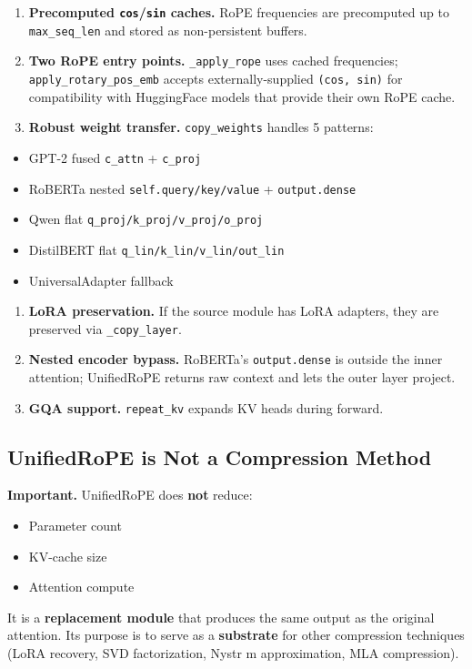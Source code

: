\begin{enumerate}
\item \textbf{Precomputed \texttt{cos}/\texttt{sin} caches.} RoPE frequencies are precomputed up
  to \texttt{max\_seq\_len} and stored as non-persistent buffers.

\item \textbf{Two RoPE entry points.} \texttt{\_apply\_rope} uses cached frequencies;
  \texttt{apply\_rotary\_pos\_emb} accepts externally-supplied \texttt{(cos, sin)} for
  compatibility with HuggingFace models that provide their own RoPE cache.

\item \textbf{Robust weight transfer.} \texttt{copy\_weights} handles 5 patterns:
\end{enumerate}
\begin{itemize}
\item GPT-2 fused \texttt{c\_attn} + \texttt{c\_proj}
\item RoBERTa nested \texttt{self.query/key/value} + \texttt{output.dense}
\item Qwen flat \texttt{q\_proj/k\_proj/v\_proj/o\_proj}
\item DistilBERT flat \texttt{q\_lin/k\_lin/v\_lin/out\_lin}
\item UniversalAdapter fallback

\end{itemize}
\begin{enumerate}
\item \textbf{LoRA preservation.} If the source module has LoRA adapters, they
  are preserved via \texttt{\_copy\_layer}.

\item \textbf{Nested encoder bypass.} RoBERTa's \texttt{output.dense} is outside the inner
  attention; UnifiedRoPE returns raw context and lets the outer layer
  project.

\item \textbf{GQA support.} \texttt{repeat\_kv} expands KV heads during forward.

\end{enumerate}
\subsection{UnifiedRoPE is Not a Compression Method}

\textbf{Important.} UnifiedRoPE does \textbf{not} reduce:
\begin{itemize}
\item Parameter count
\item KV-cache size
\item Attention compute

\end{itemize}
It is a \textbf{replacement module} that produces the same output as the 
original attention. Its purpose is to serve as a \textbf{substrate} for other 
compression techniques (LoRA recovery, SVD factorization, Nystr m 
approximation, MLA compression).

